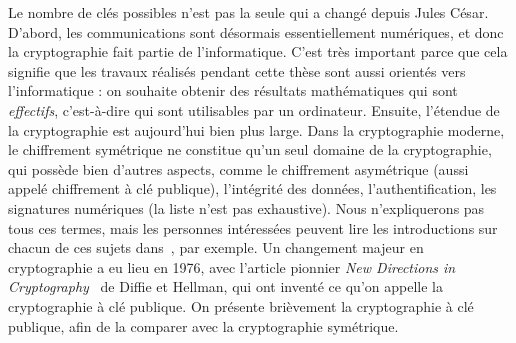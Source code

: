 Le nombre de clés possibles n'est pas la seule qui a changé depuis Jules César.
D'abord, les communications sont désormais essentiellement numériques, et donc
la cryptographie fait partie de l'informatique. C'est très important parce que
cela signifie que les travaux réalisés pendant cette thèse sont aussi orientés
vers l'informatique : on souhaite obtenir des résultats mathématiques qui sont
\emph{effectifs}, c'est-à-dire qui sont utilisables par un ordinateur. Ensuite,
l'étendue de la cryptographie est aujourd'hui bien plus large. Dans la
cryptographie moderne, le chiffrement symétrique ne constitue qu'un seul domaine
de la cryptographie, qui possède bien d'autres aspects, comme le chiffrement
asymétrique (aussi appelé chiffrement à clé publique), l'intégrité des données,
l'authentification, les signatures numériques (la liste n'est pas exhaustive).
Nous n'expliquerons pas tous ces termes, mais les personnes intéressées peuvent
lire les introductions sur chacun de ces sujets dans~\cite{MVOV18}, par exemple.
Un changement majeur en cryptographie a eu lieu en 1976, avec l'article pionnier
\emph{New Directions in Cryptography}~\cite{DH76} de Diffie et Hellman, qui ont
inventé ce qu'on appelle la cryptographie à clé publique. On présente brièvement
la cryptographie à clé publique, afin de la comparer avec la cryptographie
symétrique.


